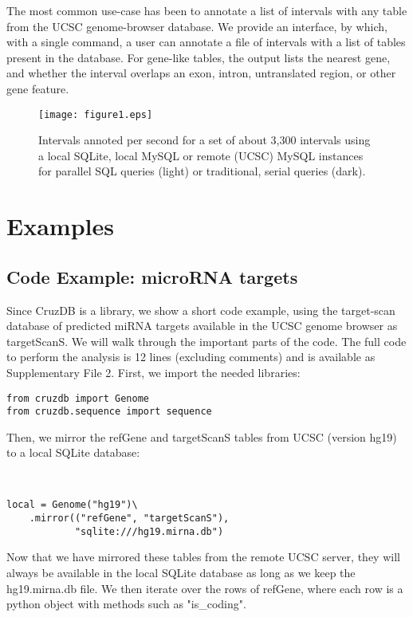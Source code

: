 \documentclass{bioinfo}
\begin{document}
\begin{methods}
The most common use-case has been to annotate a list of intervals with any table from the UCSC genome-browser database. We provide an interface, by which, with a single command, a user can annotate a file of intervals with a list of tables present in the database. For gene-like tables, the output lists the nearest gene, and whether the interval overlaps an exon, intron, untranslated region, or other gene feature.

\begin{figure}[!tpb]%
\centerline{\texttt{[image: figure1.eps]}}
\caption{Intervals annoted per second for a set of about 3,300 intervals using a local SQLite,
local MySQL or remote (UCSC) MySQL instances for parallel SQL queries (light) or traditional, 
serial queries (dark).
}\label{fig:01}
\end{figure}
\end{methods}

\section{Examples}


\subsection{Code Example: microRNA targets}

Since CruzDB is a library, we show a short code example, using the target-scan database of predicted miRNA targets \citep{Grimson} available in the UCSC genome browser as targetScanS. We will walk through the important parts of the code. The full code to perform the analysis is 12 lines (excluding comments) and is available as Supplementary File 2. First, we import the needed libraries:

\begin{verbatim}
from cruzdb import Genome
from cruzdb.sequence import sequence
\end{verbatim}

Then, we mirror the refGene and targetScanS tables from UCSC (version hg19) to a local SQLite database:
\begin{verbatim}


local = Genome("hg19")\
    .mirror(("refGene", "targetScanS"),
            "sqlite:///hg19.mirna.db")
\end{verbatim}

Now that we have mirrored these tables from the remote UCSC server, they will always be available in the local SQLite database as long as we keep the hg19.mirna.db file. We then iterate over the rows of refGene, where each row is a python object with methods such as "is\_coding".
\end{document}
